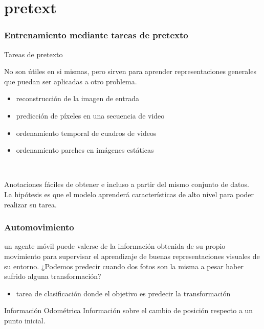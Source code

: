 \documentclass{beamer}
\begin{document}
\section{pretext}
\begin{frame}
\frametitle{Entrenamiento mediante tareas de pretexto}
Tareas de pretexto \\\vfill

No son útiles en si mismas, pero sirven para aprender representaciones generales que puedan ser aplicadas a otro problema.\\\vfill
	
\begin{itemize}
    \item reconstrucción de la imagen de entrada
    \item predicción de píxeles en una secuencia de video 
    \item ordenamiento temporal de cuadros de videos
    \item ordenamiento parches en imágenes estáticas
\end{itemize}\\
\vfill

Anotaciones fáciles de obtener e incluso a partir del mismo conjunto de datos. \\
\vfill
La hipótesis es que el modelo aprenderá características de alto nivel para poder realizar su tarea.
\vfill
\end{frame}






\begin{frame}
\frametitle{Automovimiento}
\vfill
un agente móvil puede valerse de la información obtenida de su propio movimiento para
supervisar el aprendizaje de buenas representaciones visuales de su
entorno.
\vfill
¿Podemos predecir cuando dos fotos son la misma a pesar haber sufrido alguna transformación?\\

\vfill

\begin{itemize}
    \item tarea de clasificación donde el objetivo es predecir la transformación 
\end{itemize}

\vfill

\begin{block}{Información Odométrica}
Información sobre el cambio de posición respecto a un punto inicial.
\end{block}
\vfill
\end{frame}
\end{document}
